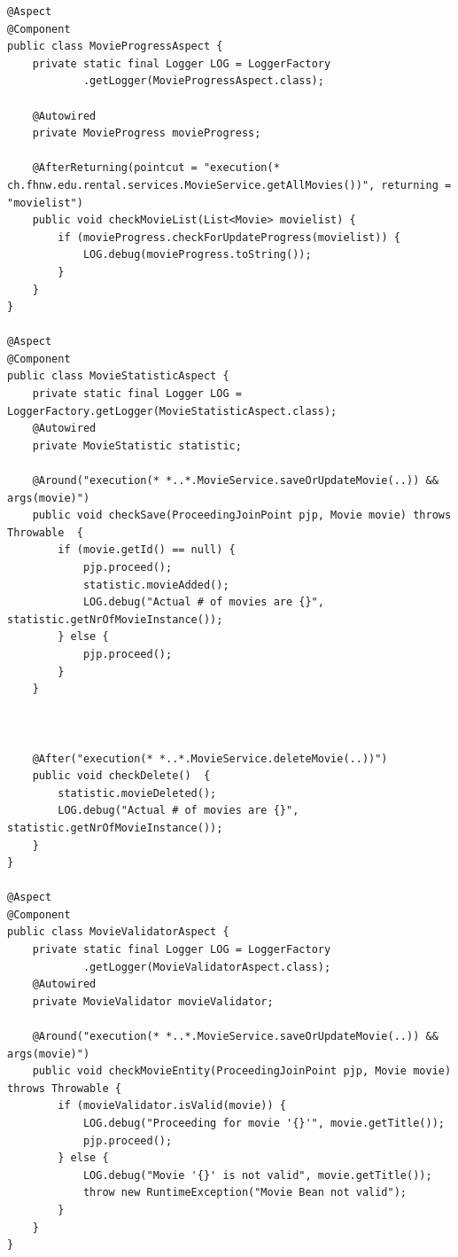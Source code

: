 \documentclass[a4paper,10pt]{scrreprt}
\begin{document}
\begin{lstlisting}[caption=Aspekt Beispiele]
 @Aspect
@Component
public class MovieProgressAspect {
	private static final Logger LOG = LoggerFactory
			.getLogger(MovieProgressAspect.class);

	@Autowired
	private MovieProgress movieProgress;

	@AfterReturning(pointcut = "execution(* ch.fhnw.edu.rental.services.MovieService.getAllMovies())", returning = 
"movielist")
	public void checkMovieList(List<Movie> movielist) {
		if (movieProgress.checkForUpdateProgress(movielist)) {
			LOG.debug(movieProgress.toString());
		}
	}
}

@Aspect
@Component
public class MovieStatisticAspect {
    private static final Logger LOG = LoggerFactory.getLogger(MovieStatisticAspect.class);
    @Autowired
    private MovieStatistic statistic;

    @Around("execution(* *..*.MovieService.saveOrUpdateMovie(..)) && args(movie)")
    public void checkSave(ProceedingJoinPoint pjp, Movie movie) throws Throwable  {
	    if (movie.getId() == null) {
	    	pjp.proceed();
	    	statistic.movieAdded();
	    	LOG.debug("Actual # of movies are {}", statistic.getNrOfMovieInstance());
    	} else {
    		pjp.proceed();
    	}
    }
    
    
    
    @After("execution(* *..*.MovieService.deleteMovie(..))")
    public void checkDelete()  {
    	statistic.movieDeleted();
    	LOG.debug("Actual # of movies are {}", statistic.getNrOfMovieInstance());
    }    
}

@Aspect
@Component
public class MovieValidatorAspect {
	private static final Logger LOG = LoggerFactory
			.getLogger(MovieValidatorAspect.class);
	@Autowired
	private MovieValidator movieValidator;

	@Around("execution(* *..*.MovieService.saveOrUpdateMovie(..)) && args(movie)")
	public void checkMovieEntity(ProceedingJoinPoint pjp, Movie movie) throws Throwable {
		if (movieValidator.isValid(movie)) {
			LOG.debug("Proceeding for movie '{}'", movie.getTitle());
			pjp.proceed();
		} else {
			LOG.debug("Movie '{}' is not valid", movie.getTitle());
			throw new RuntimeException("Movie Bean not valid");
		}
	}
}
\end{lstlisting}
\end{document}
